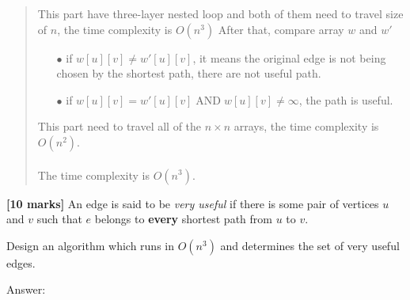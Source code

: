 \documentclass{article}
\DeclareMathOperator{\AND}{AND}
\begin{document}
\begin{Question}
\begin{Subquestion}
\begin{answer}
\begin{quote}
\begin{center}
\begin{itemize}
        \end{itemize}
    \end{center}
    This part have three-layer nested loop and both of them need to travel size of $n$, the time complexity is $O(n^3)$
    After that, compare array $w$ and $w'$
    \begin{itemize}
        \item [$\bullet$] if $w[u][v] \neq w'[u][v]$, it means the original edge is not being chosen by the shortest path, there are not useful path.
        \item [$\bullet$] if $w[u][v] = w'[u][v] \AND w[u][v] \neq \infty$, the path is useful.
    \end{itemize}
    This part need to travel all of the $n\times n$ arrays, the time complexity is $O(n^2)$.\\\\
    The time complexity is $O(n^3)$.\\
    
    
\end{quote}
\end{answer}
\end{Subquestion}

\clearpage
\begin{Subquestion}
\textbf{[10 marks]} An edge is said to be \textit{very useful} if there is some pair of vertices $u$ and $v$ such that $e$ belongs to \textbf{every} shortest path from $u$ to $v$.

Design an algorithm which runs in $O(n^3)$ and determines the set of very useful edges.\\

\begin{answer}
Answer:
\begin{quote}
    
\end{quote}
\end{answer}
\end{Subquestion}
\end{Question}
\end{document}
